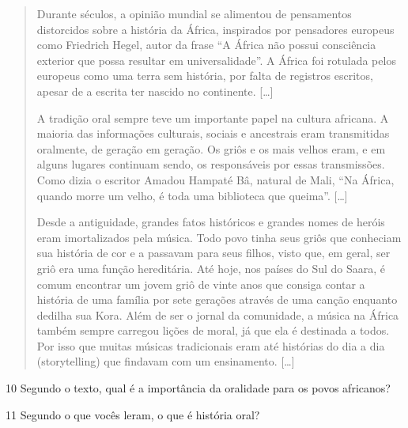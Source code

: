 \begin{quote}
Durante séculos, a opinião mundial se alimentou de pensamentos
distorcidos sobre a história da África, inspirados por pensadores
europeus como Friedrich Hegel, autor da frase “A África não possui
consciência exterior que possa resultar em universalidade”. A África
foi rotulada pelos europeus como uma terra sem história, por falta de
registros escritos, apesar de a escrita ter nascido no continente. {[}\ldots{}{]}

A tradição oral sempre teve um importante papel na cultura africana. A
maioria das informações culturais, sociais e ancestrais eram
transmitidas oralmente, de geração em geração. Os griôs e os mais
velhos eram, e em alguns lugares continuam sendo, os responsáveis por
essas transmissões. Como dizia o escritor Amadou Hampaté Bâ, natural de
Mali, “Na África, quando morre um velho, é toda uma biblioteca que
queima”. {[}\ldots{}{]}

Desde a antiguidade, grandes fatos históricos e grandes nomes de heróis
eram imortalizados pela música. Todo povo tinha seus griôs que conheciam
sua história de cor e a passavam para seus filhos, visto que, em geral,
ser griô era uma função hereditária. Até hoje, nos países do Sul do
Saara, é comum encontrar um jovem griô de vinte anos que consiga contar
a história de uma família por sete gerações através de uma canção
enquanto dedilha sua Kora. Além de ser o jornal da comunidade, a música
na África também sempre carregou lições de moral, já que ela é destinada
a todos. Por isso que muitas músicas tradicionais eram até histórias do
dia a dia (storytelling) que findavam com um ensinamento. {[}\ldots{}{]}

\end{quote}

\num{10} Segundo o texto, qual é a importância da oralidade para os povos africanos?


\pagebreak
\num{11} Segundo o que vocês leram, o que é história oral?


